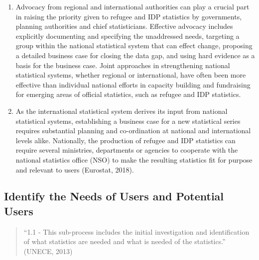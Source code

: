 \documentclass[
]{article}
\begin{document}
\begin{enumerate}
\def\labelenumi{\arabic{enumi}.}
\setcounter{enumi}{22}
\item
  Advocacy from regional and international authorities can play a
  crucial part in raising the priority given to refugee and IDP
  statistics by governments, planning authorities and chief
  statisticians. Effective advocacy includes explicitly documenting
  and specifying the unaddressed needs, targeting a group within the
  national statistical system that can effect change, proposing a
  detailed business case for closing the data gap, and using hard
  evidence as a basis for the business case. Joint approaches in
  strengthening national statistical systems, whether regional or
  international, have often been more effective than individual
  national efforts in capacity building and fundraising for emerging
  areas of official statistics, such as refugee and IDP statistics.
\item
  As the international statistical system derives its input from
  national statistical systems, establishing a business case for a new
  statistical series requires substantial planning and co-ordination
  at national and international levels alike. Nationally, the
  production of refugee and IDP statistics can require several
  ministries, departments or agencies to cooperate with the national
  statistics office (NSO) to make the resulting statistics fit for
  purpose and relevant to users (Eurostat, 2018).
\end{enumerate}

\hypertarget{identify-the-needs-of-users-and-potential-users}{%
\subsection{Identify the Needs of Users and Potential Users}\label{identify-the-needs-of-users-and-potential-users}}

\begin{quote}
``1.1 - This sub-process includes the initial investigation and
identification of what statistics are needed and what is needed of the
statistics.'' (UNECE, 2013)
\end{quote}
\end{document}
